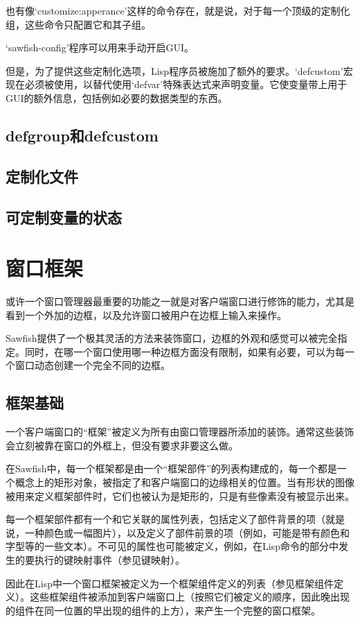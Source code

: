 \documentclass{book}
\begin{document}
\begin{CJK*}{UTF8}{gbsn}
也有像`customize:apperance'这样的命令存在，就是说，对于每一个顶级的定制化组，这些命令只配置它和其子组。

`sawfish-config'程序可以用来手动开启GUI。

但是，为了提供这些定制化选项，Lisp程序员被施加了额外的要求。`defcustom'宏现在必须被使用，以替代使用`defvar'特殊表达式来声明变量。它使变量带上用于GUI的额外信息，包括例如必要的数据类型的东西。
\section{defgroup和defcustom}
\section{定制化文件}
\section{可定制变量的状态}
\chapter{窗口框架}
或许一个窗口管理器最重要的功能之一就是对客户端窗口进行修饰的能力，尤其是看到一个外加的边框，以及允许窗口被用户在边框上输入来操作。

Sawfish提供了一个极其灵活的方法来装饰窗口，边框的外观和感觉可以被完全指定。同时，在哪一个窗口使用哪一种边框方面没有限制，如果有必要，可以为每一个窗口动态创建一个完全不同的边框。
\section{框架基础}
一个客户端窗口的``框架''被定义为所有由窗口管理器所添加的装饰。通常这些装饰会立刻被靠在窗口的外框上，但没有要求非要这么做。

在Sawfish中，每一个框架都是由一个``框架部件''的列表构建成的，每一个都是一个概念上的矩形对象，被指定了和客户端窗口的边缘相关的位置。当有形状的图像被用来定义框架部件时，它们也被认为是矩形的，只是有些像素没有被显示出来。

每一个框架部件都有一个和它关联的属性列表，包括定义了部件背景的项（就是说，一种颜色或一幅图片），以及定义了部件前景的项（例如，可能是带有颜色和字型等的一些文本）。不可见的属性也可能被定义，例如，在Lisp命令的部分中发生的要执行的键映射事件（参见键映射）。

因此在Lisp中一个窗口框架被定义为一个框架组件定义的列表（参见框架组件定义）。这些框架组件被添加到客户端窗口上（按照它们被定义的顺序，因此晚出现的组件在同一位置的早出现的组件的上方），来产生一个完整的窗口框架。

\end{CJK*}
\end{document}
